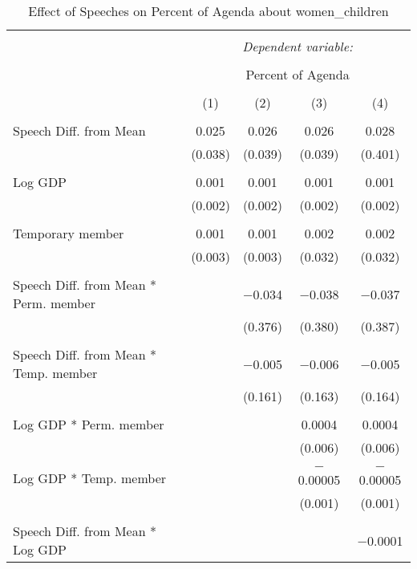 
\begin{table}[!htbp] \centering 
  \caption{Effect of Speeches on Percent of Agenda about women_children} 
  \label{} 
\begin{tabular}{@{\extracolsep{5pt}}lcccc} 
\\[-1.8ex]\hline 
\hline \\[-1.8ex] 
 & \multicolumn{4}{c}{\textit{Dependent variable:}} \\ 
\cline{2-5} 
\\[-1.8ex] & \multicolumn{4}{c}{Percent of Agenda} \\ 
\\[-1.8ex] & (1) & (2) & (3) & (4)\\ 
\hline \\[-1.8ex] 
 Speech Diff. from Mean & 0.025 & 0.026 & 0.026 & 0.028 \\ 
  & (0.038) & (0.039) & (0.039) & (0.401) \\ 
  & & & & \\ 
 Log GDP & 0.001 & 0.001 & 0.001 & 0.001 \\ 
  & (0.002) & (0.002) & (0.002) & (0.002) \\ 
  & & & & \\ 
 Temporary member & 0.001 & 0.001 & 0.002 & 0.002 \\ 
  & (0.003) & (0.003) & (0.032) & (0.032) \\ 
  & & & & \\ 
 Speech Diff. from Mean * Perm. member &  & $-$0.034 & $-$0.038 & $-$0.037 \\ 
  &  & (0.376) & (0.380) & (0.387) \\ 
  & & & & \\ 
 Speech Diff. from Mean * Temp. member &  & $-$0.005 & $-$0.006 & $-$0.005 \\ 
  &  & (0.161) & (0.163) & (0.164) \\ 
  & & & & \\ 
 Log GDP * Perm. member &  &  & 0.0004 & 0.0004 \\ 
  &  &  & (0.006) & (0.006) \\ 
  & & & & \\ 
 Log GDP * Temp. member &  &  & $-$0.00005 & $-$0.00005 \\ 
  &  &  & (0.001) & (0.001) \\ 
  & & & & \\ 
 Speech Diff. from Mean * Log GDP &  &  &  & $-$0.0001 \\ 

\end{tabular}
\end{table}
